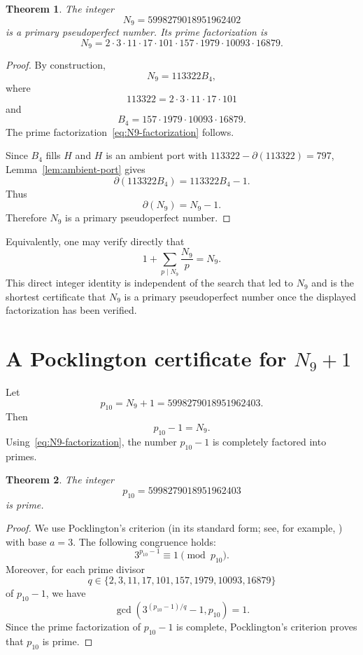\documentclass[11pt]{amsart}
\theoremstyle{plain}
\newtheorem{theorem}{Theorem}[section]
\theoremstyle{definition}
\theoremstyle{remark}
\newcommand{\dd}{\partial}
\begin{document}
\begin{theorem}\label{thm:N9}
The integer
\[
        N_9=5998279018951962402
\]
is a primary pseudoperfect number.  Its prime factorization is
\begin{equation}\label{eq:N9-factorization}
        N_9
        =2\cdot3\cdot11\cdot17\cdot101\cdot157\cdot1979\cdot10093\cdot16879.
\end{equation}
\end{theorem}

\begin{proof}
By construction,
\[
        N_9=113322B_4,
\]
where
\[
        113322=2\cdot3\cdot11\cdot17\cdot101
\]
and
\[
        B_4=157\cdot1979\cdot10093\cdot16879.
\]
The prime factorization~\eqref{eq:N9-factorization} follows.

Since $B_4$ fills $H$ and $H$ is an ambient port with $113322-\dd(113322)=797$, Lemma~\ref{lem:ambient-port} gives
\[
        \dd(113322B_4)=113322B_4-1.
\]
Thus
\[
        \dd(N_9)=N_9-1.
\]
Therefore $N_9$ is a primary pseudoperfect number.
\end{proof}

Equivalently, one may verify directly that
\[
        1+\sum_{p\mid N_9}\frac{N_9}{p}=N_9.
\]
This direct integer identity is independent of the search that led to $N_9$ and is the shortest certificate that $N_9$ is a primary pseudoperfect number once the displayed factorization has been verified.

\section{A Pocklington certificate for \texorpdfstring{$N_9+1$}{N9+1}}

Let
\begin{equation}\label{eq:p10-def}
        p_{10}=N_9+1=5998279018951962403.
\end{equation}
Then
\[
        p_{10}-1=N_9.
\]
Using~\eqref{eq:N9-factorization}, the number $p_{10}-1$ is completely factored into primes.

\begin{theorem}\label{thm:p10-prime}
The integer
\[
        p_{10}=5998279018951962403
\]
is prime.
\end{theorem}

\begin{proof}
We use Pocklington's criterion (in its standard form; see, for example, \cite[Sec.~3.4]{CrandallPomerance}) with base $a=3$.
The following congruence holds:
\[
        3^{p_{10}-1}\equiv1\pmod {p_{10}}.
\]
Moreover, for each prime divisor
\[
        q\in\{2,3,11,17,101,157,1979,10093,16879\}
\]
of $p_{10}-1$, we have
\[
        \gcd\left(3^{(p_{10}-1)/q}-1,p_{10}\right)=1.
\]
Since the prime factorization of $p_{10}-1$ is complete, Pocklington's criterion proves that $p_{10}$ is prime.
\end{proof}
\end{document}
